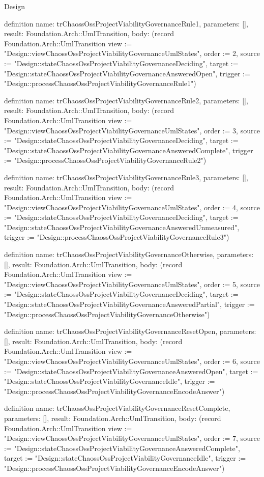 \begin{lexlean}{Design}
\begin{semanticmodule}
definition{
  name: trChaossOssProjectViabilityGovernanceRule1,
  parameters: [],
  result: Foundation.Arch::UmlTransition,
  body: (record Foundation.Arch::UmlTransition {view := "Design::viewChaossOssProjectViabilityGovernanceUmlStates", order := 2, source := "Design::stateChaossOssProjectViabilityGovernanceDeciding", target := "Design::stateChaossOssProjectViabilityGovernanceAnsweredOpen", trigger := "Design::processChaossOssProjectViabilityGovernanceRule1"})
}

definition{
  name: trChaossOssProjectViabilityGovernanceRule2,
  parameters: [],
  result: Foundation.Arch::UmlTransition,
  body: (record Foundation.Arch::UmlTransition {view := "Design::viewChaossOssProjectViabilityGovernanceUmlStates", order := 3, source := "Design::stateChaossOssProjectViabilityGovernanceDeciding", target := "Design::stateChaossOssProjectViabilityGovernanceAnsweredComplete", trigger := "Design::processChaossOssProjectViabilityGovernanceRule2"})
}

definition{
  name: trChaossOssProjectViabilityGovernanceRule3,
  parameters: [],
  result: Foundation.Arch::UmlTransition,
  body: (record Foundation.Arch::UmlTransition {view := "Design::viewChaossOssProjectViabilityGovernanceUmlStates", order := 4, source := "Design::stateChaossOssProjectViabilityGovernanceDeciding", target := "Design::stateChaossOssProjectViabilityGovernanceAnsweredUnmeasured", trigger := "Design::processChaossOssProjectViabilityGovernanceRule3"})
}

definition{
  name: trChaossOssProjectViabilityGovernanceOtherwise,
  parameters: [],
  result: Foundation.Arch::UmlTransition,
  body: (record Foundation.Arch::UmlTransition {view := "Design::viewChaossOssProjectViabilityGovernanceUmlStates", order := 5, source := "Design::stateChaossOssProjectViabilityGovernanceDeciding", target := "Design::stateChaossOssProjectViabilityGovernanceAnsweredPartial", trigger := "Design::processChaossOssProjectViabilityGovernanceOtherwise"})
}

definition{
  name: trChaossOssProjectViabilityGovernanceResetOpen,
  parameters: [],
  result: Foundation.Arch::UmlTransition,
  body: (record Foundation.Arch::UmlTransition {view := "Design::viewChaossOssProjectViabilityGovernanceUmlStates", order := 6, source := "Design::stateChaossOssProjectViabilityGovernanceAnsweredOpen", target := "Design::stateChaossOssProjectViabilityGovernanceIdle", trigger := "Design::processChaossOssProjectViabilityGovernanceEncodeAnswer"})
}

definition{
  name: trChaossOssProjectViabilityGovernanceResetComplete,
  parameters: [],
  result: Foundation.Arch::UmlTransition,
  body: (record Foundation.Arch::UmlTransition {view := "Design::viewChaossOssProjectViabilityGovernanceUmlStates", order := 7, source := "Design::stateChaossOssProjectViabilityGovernanceAnsweredComplete", target := "Design::stateChaossOssProjectViabilityGovernanceIdle", trigger := "Design::processChaossOssProjectViabilityGovernanceEncodeAnswer"})
}


\end{semanticmodule}
\end{lexlean}
